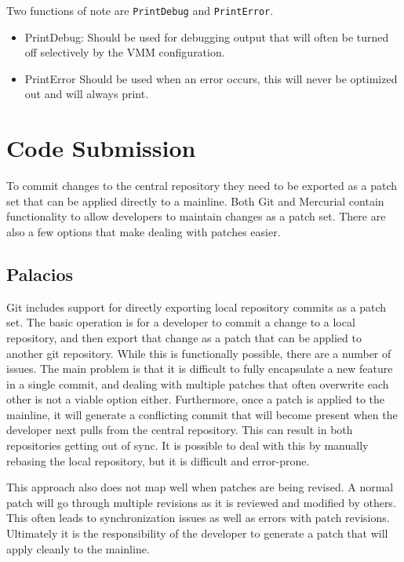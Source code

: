 \documentclass[11pt]{article}
\begin{document}
Two functions of note are \verb.PrintDebug. and \verb.PrintError..

\begin{itemize}

\item PrintDebug:
\newline
Should be used for debugging output that will often be turned off
selectively by the VMM configuration.

\item PrintError
\newline
Should be used when an error occurs, this will never be optimized out
and will always print. 
\end{itemize}


\section{Code Submission}
\label{sec:submission}

To commit changes to the central repository they need to be exported
as a patch set that can be applied directly to a mainline. Both Git
and Mercurial contain functionality to allow developers to maintain
changes as a patch set. There are also a few options that make dealing
with patches easier.

\subsection{Palacios}

Git includes support for directly exporting local repository commits
as a patch set. The basic operation is for a developer to commit a
change to a local repository, and then export that change as a patch
that can be applied to another git repository. While this is
functionally possible, there are a number of issues. The main problem
is that it is difficult to fully encapsulate a new feature in a single
commit, and dealing with multiple patches that often overwrite each
other is not a viable option either. Furthermore, once a patch is
applied to the mainline, it will generate a conflicting commit that
will become present when the developer next pulls from the central
repository. This can result in both repositories getting out of
sync. It is possible to deal with this by manually rebasing the local
repository, but it is difficult and error-prone. 

This approach also does not map well when patches are being revised. A
normal patch will go through multiple revisions as it is reviewed and
modified by others. This often leads to synchronization issues as well
as errors with patch revisions. Ultimately it is the responsibility of
the developer to generate a patch that will apply cleanly to the
mainline.
\end{document}
